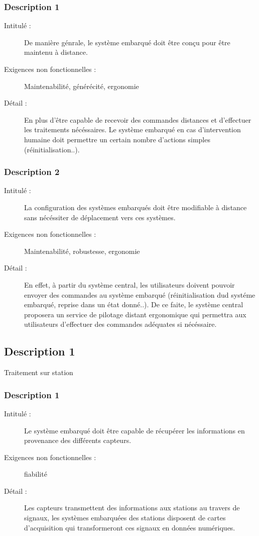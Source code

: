  \subsubsection {Description 1}
\begin{description}
           \item[Intitulé :] De manière génrale, le système embarqué doit être conçu pour être maintenu à distance.
           \item[Exigences non fonctionnelles :] Maintenabilité, générécité, ergonomie
           \item[Détail :] En plus d'être capable de recevoir des commandes distances et d'effectuer les traitements nécéssaires.
Le système embarqué en cas d'intervention humaine doit permettre un certain nombre d'actions 
simples (réinitialisation..).
\end{description}

 \subsubsection {Description 2}
\begin{description}
           \item[Intitulé :] La configuration des systèmes embarqués doit être modifiable à distance sans nécéssiter de déplacement vers 
ces systèmes.
           \item[Exigences non fonctionnelles :] Maintenabilité, robustesse, ergonomie
           \item[Détail :] En effet, à partir du système central, les utilisateurs doivent pouvoir envoyer des commandes au système
embarqué (réinitialisation dud systéme embarqué, reprise dans un état donné..). De ce faite, le système central 
proposera un service de pilotage distant ergonomique qui permettra aux utilisateurs d'effectuer des commandes 
adéquates si nécéssaire.
\end{description}


\subsection {Description 1}Traitement sur station
\subsubsection {Description 1}
\begin{description}
           \item[Intitulé :] Le système embarqué doit être capable de récupérer les informations en provenance des différents capteurs.
           \item[Exigences non fonctionnelles :] fiabilité
           \item[Détail :] Les capteurs transmettent des informations aux stations au travers de signaux, les systèmes embarquées des
stations disposent de cartes d'acquisition qui transformeront ces signaux en données numériques. 
\end{description}

